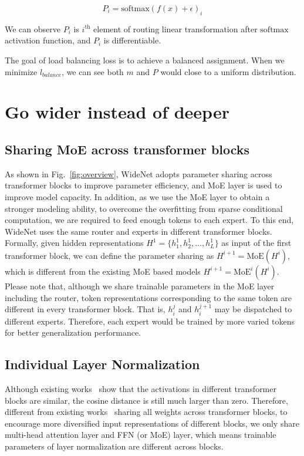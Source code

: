 \documentclass[letterpaper]{article} %
\begin{document}
\begin{equation}
P_i = \mathrm{softmax}(f(x)+\epsilon)_i
\end{equation}

We can observe $P_i$ is $i^{\mathrm{th}}$ element of routing linear transformation after $\mathrm{softmax}$ activation function, and $P_i$ is differentiable. 

The goal of load balancing loss is to achieve a balanced assignment. When we minimize $l_{balance}$, we can see both $m$ and $P$ would close to a uniform distribution. 




\section{Go wider instead of deeper}
\label{sec:wide}

\subsection{Sharing MoE across transformer blocks}


As shown in Fig.~\ref{fig:overview}, WideNet adopts parameter sharing across transformer blocks to improve parameter efficiency, and MoE layer is used to improve model capacity. In addition, as we use the MoE layer to obtain a stronger modeling ability, to overcome the overfitting from sparse conditional computation, we are required to feed enough tokens to each expert. To this end, WideNet uses the same router and experts in different transformer blocks. Formally, given hidden representations $H^1=\{h_1^1,h_2^1,\dots,h_L^1\}$ as input of the first transformer block, we can define the parameter sharing as $H^{i+1}=\mathrm{MoE}(H^i)$, which is different from the existing MoE based models $H^{i+1}=\mathrm{MoE}^i(H^i)$. Please note that, although we share trainable parameters in the MoE layer including the router, token representations corresponding to the same token are different in every transformer block. That is, $h_i^j$ and $h_i^{j+1}$ may be dispatched to different experts. Therefore, each expert would be trained by more varied tokens for better generalization performance. 



\subsection{Individual Layer Normalization}
Although existing works~\citep{lan2019albert} show that the activations in different transformer blocks are similar, the cosine distance is still much larger than zero. Therefore, different from existing works~\citep{dehghani2018universal,lan2019albert} sharing all weights across transformer blocks, to encourage more diversified input representations of different blocks, we only share multi-head attention layer and FFN (or MoE) layer, which means trainable parameters of layer normalization are different across blocks. 
\end{document}
